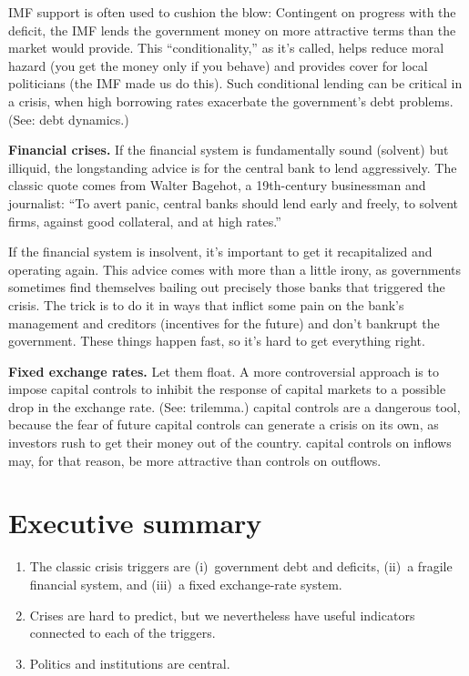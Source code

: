 IMF support is often used to cushion the blow: Contingent on progress with the deficit,
the IMF lends the government money on more attractive terms
than the market would provide.
This ``conditionality,'' as it's called,
helps reduce moral hazard (you get the money only if you behave)
and provides cover for local politicians (the IMF made us do this).
Such conditional lending can be critical in a crisis,
when high borrowing rates exacerbate the government's debt problems.
(See:  debt dynamics.)


\textbf{Financial crises.}
If the financial system is fundamentally sound (solvent) but illiquid,
the longstanding advice is for the central bank  to lend aggressively.
The classic quote comes from Walter Bagehot,
a 19th-century businessman and journalist:
``To avert panic, central banks  should lend early and freely,
to solvent firms, against good collateral, and at high rates.''


If the financial system is insolvent,
it's important to get it recapitalized and operating again.
This advice comes with more than a little irony,
as governments sometimes find themselves bailing out
precisely those banks that triggered the crisis.
The trick is to do it in ways that inflict some pain
on the bank's management and creditors
(incentives for the future) and don't bankrupt the government.
These things happen fast, so it's hard to get everything right.


\textbf{Fixed exchange rates.} Let them float.
A more controversial approach is to impose capital controls   to inhibit the
response of capital markets to a possible drop in the exchange rate.
(See:  trilemma.)
capital controls   are a dangerous tool,
because the fear of future capital controls
can generate a crisis on its own,
as investors rush to get their money out of the country.
capital controls   on inflows may, for that reason, be more attractive
than controls on outflows.


\section*{Executive summary}

\setlength{\leftmargini}{.5\oldleftmargini}
\begin{enumerate}\itemsep=0.0in
\item The classic crisis triggers are
(i)~government debt and deficits,
(ii)~a fragile financial system,
and (iii)~a fixed exchange-rate system.

\item Crises are hard to predict,
but we nevertheless have useful indicators connected to each
of the triggers.

\item Politics and institutions are central.
\end{enumerate}
\setlength{\leftmargini}{\oldleftmargini}

